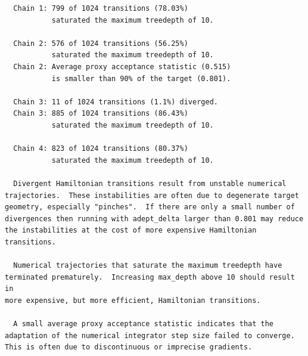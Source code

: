 \documentclass[
  letterpaper,
  DIV=11,
  numbers=noendperiod]{scrartcl}
\newenvironment{Shaded}{\begin{snugshade}}{\end{snugshade}}
\newcommand{\AttributeTok}[1]{\textcolor[rgb]{0.40,0.45,0.13}{#1}}
\newcommand{\ConstantTok}[1]{\textcolor[rgb]{0.56,0.35,0.01}{#1}}
\newcommand{\FunctionTok}[1]{\textcolor[rgb]{0.28,0.35,0.67}{#1}}
\newcommand{\NormalTok}[1]{\textcolor[rgb]{0.00,0.23,0.31}{#1}}
\newcommand{\OtherTok}[1]{\textcolor[rgb]{0.00,0.23,0.31}{#1}}
\newcommand{\SpecialCharTok}[1]{\textcolor[rgb]{0.37,0.37,0.37}{#1}}
\newcommand{\StringTok}[1]{\textcolor[rgb]{0.13,0.47,0.30}{#1}}
\begin{document}
\begin{verbatim}
  Chain 1: 799 of 1024 transitions (78.03%)
           saturated the maximum treedepth of 10.

  Chain 2: 576 of 1024 transitions (56.25%)
           saturated the maximum treedepth of 10.
  Chain 2: Average proxy acceptance statistic (0.515)
           is smaller than 90% of the target (0.801).

  Chain 3: 11 of 1024 transitions (1.1%) diverged.
  Chain 3: 885 of 1024 transitions (86.43%)
           saturated the maximum treedepth of 10.

  Chain 4: 823 of 1024 transitions (80.37%)
           saturated the maximum treedepth of 10.

  Divergent Hamiltonian transitions result from unstable numerical
trajectories.  These instabilities are often due to degenerate target
geometry, especially "pinches".  If there are only a small number of
divergences then running with adept_delta larger than 0.801 may reduce
the instabilities at the cost of more expensive Hamiltonian
transitions.

  Numerical trajectories that saturate the maximum treedepth have
terminated prematurely.  Increasing max_depth above 10 should result in
more expensive, but more efficient, Hamiltonian transitions.

  A small average proxy acceptance statistic indicates that the
adaptation of the numerical integrator step size failed to converge.
This is often due to discontinuous or imprecise gradients.
\end{verbatim}

\begin{Shaded}
\end{Shaded}
\end{document}
